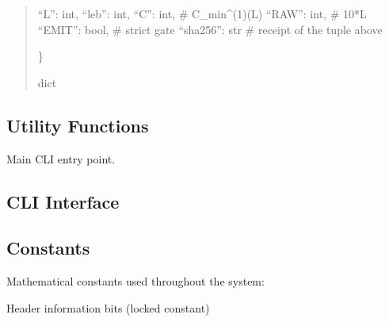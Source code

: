 \documentclass[letterpaper,10pt,english]{sphinxmanual}
\begin{document}
\begin{fulllineitems}
\begin{quote}
\begin{description}
\begin{description}
\sphinxlineitem{\{}
\sphinxAtStartPar
“L”: int,
“leb”: int,
“C”: int,       \# C\_min\textasciicircum{}(1)(L)
“RAW”: int,     \# 10*L
“EMIT”: bool,   \# strict gate
“sha256”: str   \# receipt of the tuple above

\end{description}

\sphinxAtStartPar
\}

\sphinxAtStartPar
dict

\end{description}\end{quote}

\end{fulllineitems}



\subsection{Utility Functions}
\label{\detokenize{api_reference:utility-functions}}

\begin{fulllineitems}
\label{\detokenize{api_reference:clf_calculator.main}}
\pysigstartsignatures
\pysiglinewithargsret
{}
{}
{}
\pysigstopsignatures
\sphinxAtStartPar
Main CLI entry point.

\end{fulllineitems}



\subsection{CLI Interface}
\label{\detokenize{api_reference:cli-interface}}

\subsection{Constants}
\label{\detokenize{api_reference:constants}}
\sphinxAtStartPar
Mathematical constants used throughout the system:

\begin{fulllineitems}
\label{\detokenize{api_reference:CLF_MAXIMAL_VALIDATOR_FINAL.H}}
\pysigstartsignatures
\pysigline
{}
\pysigstopsignatures
\sphinxAtStartPar
Header information bits (locked constant)

\end{fulllineitems}
\end{document}
